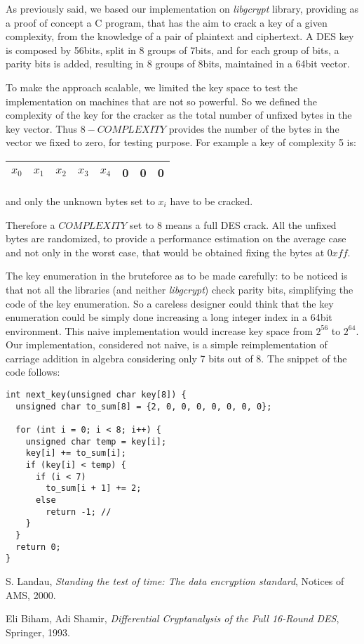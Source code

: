 \documentclass[11pt]{article}
\begin{document}
  As previously said, we based our implementation on \textit{libgcrypt} library, providing as a proof of concept a C program, that has the aim to crack a key of a given complexity, from the knowledge of a pair of plaintext and ciphertext. A DES key is composed by 56bits, split in 8 groups of 7bits, and for each group of bits, a parity bits is added, resulting in 8 groups of 8bits, maintained in a 64bit vector.

  To make the approach scalable, we limited the key space to test the implementation on machines that are not so powerful. So we defined the complexity of the key for the cracker as the total number of unfixed bytes in the key vector. Thus $8 - COMPLEXITY$ provides the number of the bytes in the vector we fixed to zero, for testing purpose.
  For example a key of complexity 5 is:
  \begin{center}
    \begin{tabular}{ | c | c | c | c | c | c | c | c |}
      \hline
      $x_0$ & $x_1$ & $x_2$ & $x_3$ & $x_4$ & 0 & 0 & 0 \\
      \hline
    \end{tabular}
  \end{center}
  and only the unknown bytes set to $x_i$ have to be cracked.

  Therefore a $COMPLEXITY$ set to 8 means a full DES crack. All the unfixed bytes are randomized, to provide a performance estimation on the average case and not only in the worst case, that would be obtained fixing the bytes at $0xff$.

  The key enumeration in the bruteforce as to be made carefully: to be noticed is that not all the libraries (and neither \textit{libgcrypt}) check parity bits, simplifying the code of the key enumeration. So a careless designer could think that the key enumeration could be simply done increasing a long integer index in a 64bit environment. This naive implementation would increase key space from $2^{56}$ to $2^{64}$.
  Our implementation, considered not naive, is a simple reimplementation of carriage addition in algebra considering only 7 bits out of 8. The snippet of the code follows:
  \bigskip
  \begin{verbatim}
int next_key(unsigned char key[8]) {
  unsigned char to_sum[8] = {2, 0, 0, 0, 0, 0, 0, 0};

  for (int i = 0; i < 8; i++) {
    unsigned char temp = key[i];
    key[i] += to_sum[i];
    if (key[i] < temp) {
      if (i < 7)
        to_sum[i + 1] += 2;
      else
        return -1; //
    }
  }
  return 0;
}

  \end{verbatim}


  \begin{thebibliography}{99}

      S. Landau,
      \textit{Standing the test of time: The data encryption standard},
      Notices of AMS,
      2000.

      Eli Biham, Adi Shamir,
      \textit{Differential Cryptanalysis of the Full 16-Round DES},
      Springer,
      1993.

  \end{thebibliography}
\end{document}
